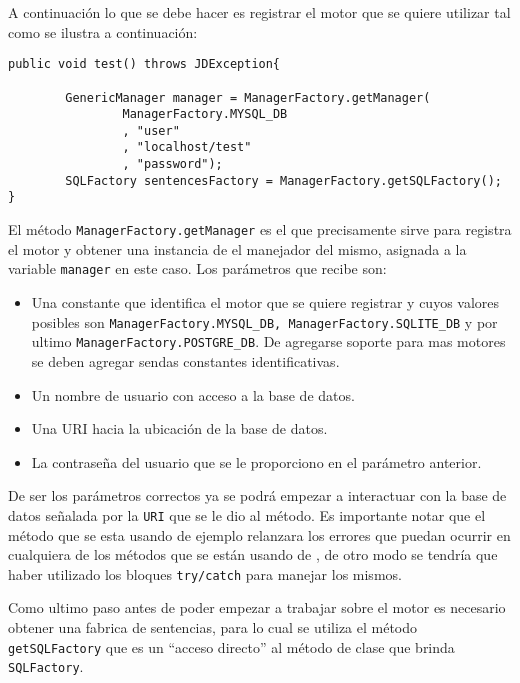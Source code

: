 A continuación lo que se debe hacer es registrar el motor que se quiere utilizar tal como se ilustra a continuación:	
%
\begin{lstlisting}[title=Registrando el motor que se quiere utilizar.]
public void test() throws JDException{
		
		GenericManager manager = ManagerFactory.getManager(
				ManagerFactory.MYSQL_DB
				, "user"
				, "localhost/test"
				, "password");
		SQLFactory sentencesFactory = ManagerFactory.getSQLFactory();
}
\end{lstlisting}
%
El método \verb=ManagerFactory.getManager= es el que precisamente sirve para registra el motor y obtener una instancia de el manejador del mismo, asignada a la variable \verb=manager= en este caso. Los parámetros que recibe son:
\begin{itemize}
\item Una constante que identifica el motor que se quiere registrar y cuyos valores posibles son \verb=ManagerFactory.MYSQL_DB, ManagerFactory.SQLITE_DB= y por ultimo \verb=ManagerFactory.POSTGRE_DB=. De agregarse soporte para mas motores se deben agregar sendas constantes identificativas.
\item Un nombre de usuario con acceso a la base de datos.
\item Una URI hacia la ubicación de la base de datos.
\item La contraseña del usuario que se le proporciono en el parámetro anterior.
\end{itemize}
De ser los parámetros correctos ya se podrá empezar a interactuar con la base de datos señalada por la \verb=URI= que se le dio al método. Es importante notar que el método que se esta usando de ejemplo relanzara los errores que puedan ocurrir en cualquiera de los métodos que se están usando de \jj, de otro modo se tendría que haber utilizado los bloques \verb=try/catch= para manejar los mismos.

Como ultimo paso antes de poder empezar a trabajar sobre el motor es necesario obtener una fabrica de sentencias, para lo cual se utiliza el método \verb=getSQLFactory= que es un ``acceso directo'' al método de clase que brinda \verb=SQLFactory=.
%
